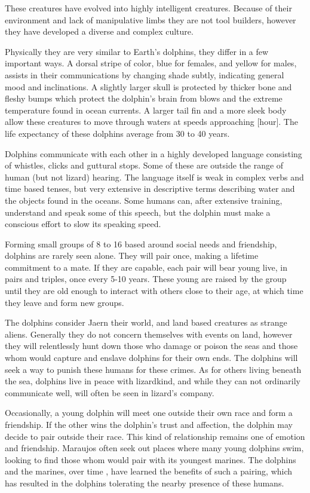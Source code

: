 These creatures have evolved into highly intelligent creatures. Because of their environment and lack of manipulative limbs they are not tool builders, however they have developed a diverse and complex culture.

Physically they are very similar to Earth's dolphins, they differ in a few important ways. A dorsal stripe of color, blue for females, and yellow for males, assists in their communications by changing shade subtly, indicating general mood and inclinations. A slightly larger skull is protected by thicker bone and fleshy bumps which protect the dolphin's brain from blows and the extreme temperature found in ocean currents. A larger tail fin and a more sleek body allow these creatures to move through waters at speeds approaching [hour]. The life expectancy of these dolphins average from 30 to 40 years.

Dolphins communicate with each other in a highly developed language consisting of whistles, clicks and guttural stops. Some of these are outside the range of human (but not lizard) hearing. The language itself is weak in complex verbs and time based tenses, but very extensive in descriptive terms describing water and the objects found in the oceans. Some humans can, after extensive training, understand and speak some of this speech, but the dolphin must make a conscious effort to slow its speaking speed.

Forming small groups of 8 to 16 based around social needs and friendship, dolphins are rarely seen alone. They will pair once, making a lifetime commitment to a mate. If they are capable, each pair will bear young live, in pairs and triples, once every 5-10 years. These young are raised by the group until they are old enough to interact with others close to their age, at which time they leave and form new groups.

The dolphins consider Jaern their world, and land based creatures as strange aliens. Generally they do not concern themselves with events on land, however they will relentlessly hunt down those who damage or poison the seas and those whom would capture and enslave dolphins for their own ends. The dolphins will seek a way to punish these humans for these crimes. As for others living beneath the sea, dolphins live in peace with lizardkind, and while they can not ordinarily communicate well, will often be seen in lizard's company.

Occasionally, a young dolphin will meet one outside their own race and form a friendship. If the other wins the dolphin's trust and affection, the dolphin may decide to pair outside their race. This kind of relationship remains one of emotion and friendship. Maraujos often seek out places where many young dolphins swim, looking to find those whom would pair with its youngest marines. The dolphins and the marines, over time , have learned the benefits of such a pairing, which has resulted in the dolphins tolerating the nearby presence of these humans.

